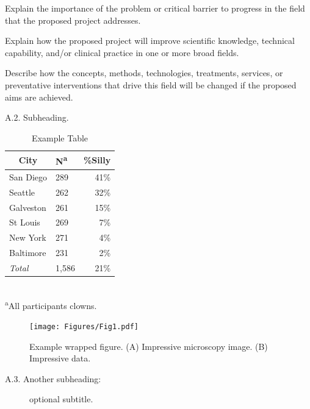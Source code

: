 \documentclass[11pt,notitlepage]{article}
\begin{document}
Explain the importance of the problem or critical barrier to progress in the field that the proposed project addresses.

Explain how the proposed project will improve scientific knowledge, technical capability, and/or clinical practice in one or more broad fields.

Describe how the concepts, methods, technologies, treatments, services, or preventative interventions that drive this field will be changed if the proposed aims are achieved.

\begin{description}
\item[A.2. Subheading.]{}
\end{description}

\begin{table} %
\caption{Example Table}
\begin{center}
\begin{tabular}{l l r}
\toprule
\multicolumn{1}{c}{City} & {N\textsuperscript{a}} & {\%Silly}\\
\midrule
San Diego & 289 & 41\%\\
Seattle & 262 & 32\%\\
Galveston & 261 & 15\%\\
St Louis & 269 & 7\%\\
New York & 271 & 4\%\\
Baltimore & 231 & 2\%\\
\emph{Total} & 1,586 & 21\%\\
\hline
\end{tabular}\\
\footnotesize\textsuperscript{a}{All participants clowns.}
\end{center}
\label{default}
\end{table}

\lipsum[8-10]

\begin{figure} %
\texttt{[image: Figures/Fig1.pdf]}
\caption{\footnotesize Example wrapped figure. (A) Impressive microscopy image. (B) Impressive data.}
\end{figure}

\lipsum[5]

\begin{description}
\item[A.3. Another subheading:]{optional subtitle.}
\end{description}
\end{document}
